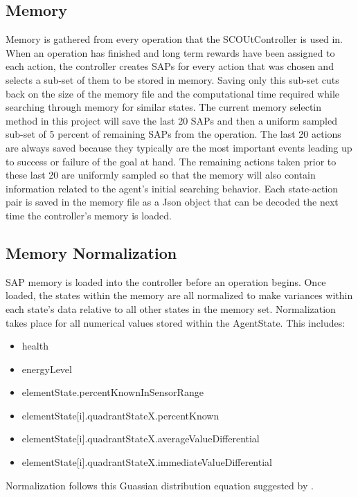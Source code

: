 \subsection{Memory}
Memory is gathered from every operation that the SCOUtController is used in.
When an operation has finished and long term rewards have been assigned to each action, the controller creates SAPs for every action that was chosen and selects a sub-set of them to be stored in memory.
Saving only this sub-set cuts back on the size of the memory file and the computational time required while searching through memory for similar states.
The current memory selectin method in this project will save the last 20 SAPs and then a uniform sampled sub-set of 5 percent of remaining SAPs from the operation.
The last 20 actions are always saved because they typically are the most important events leading up to success or failure of the goal at hand.
The remaining actions taken prior to these last 20 are uniformly sampled so that the memory will also contain information related to the agent's initial searching behavior.
Each state-action pair is saved in the memory file as a Json object that can be decoded the next time the controller's memory is loaded.


\subsection{Memory Normalization}
SAP memory is loaded into the controller before an operation begins.
Once loaded, the states within the memory are all normalized to make variances within each state's data relative to all other states in the memory set.
Normalization takes place for all numerical values stored within the AgentState.
This includes:

\begin{itemize}
\item health
\item energyLevel
\item elementState.percentKnownInSensorRange
\item elementState[i].quadrantStateX.percentKnown
\item elementState[i].quadrantStateX.averageValueDifferential
\item elementState[i].quadrantStateX.immediateValueDifferential
\end{itemize}

Normalization follows this Guassian distribution equation suggested by \cite{mccaffrey_how_nodate}.

